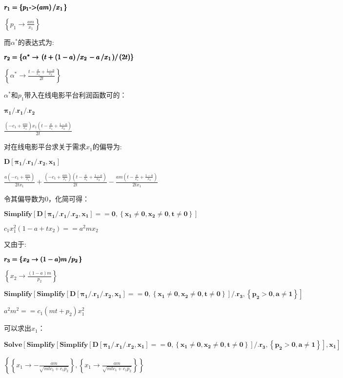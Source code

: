 \documentclass[paper=a4, fontsize=10.5pt]{scrartcl} %
\numberwithin{equation}{section} %
\numberwithin{figure}{section} %
\numberwithin{table}{section} %
\begin{document}
\begin{CJK}{UTF8}{gbsn}
\(\pmb{r_1 = \left\{p_1\text{-$>$} (a m)\left/x_1\right.\right\}}\)


\(\left\{p_1\to \frac{a m}{x_1}\right\}\)


而$\alpha^*$的表达式为:

\(\pmb{r_2 = \left\{\alpha ^* \to  \left.\left(t+ (1-a)\left/ x_2\right.-a\left/x_1\right.\right)\right/(2 t)\right\}}\)


\(\left\{\alpha ^*\to \frac{t-\frac{a}{x_1}+\frac{1-a}{x_2}}{2 t}\right\}\)


$\alpha^*$和$p_1$带入在线电影平台利润函数可的：

\(\pmb{\pi _1 \text{/.} r_1 \text{/.}r_2}\)


\(\frac{\left(-c_1+\frac{a m}{x_1}\right) x_1 \left(t-\frac{a}{x_1}+\frac{1-a}{x_2}\right)}{2 t}\)


对在线电影平台求关于需求$x_1$的偏导为:

\(\pmb{D\left[\pi _1 \text{/.} r_1 \text{/.}r_2,x_1\right]}\)


\(\frac{a \left(-c_1+\frac{a m}{x_1}\right)}{2 t x_1}+\frac{\left(-c_1+\frac{a m}{x_1}\right) \left(t-\frac{a}{x_1}+\frac{1-a}{x_2}\right)}{2
		t}-\frac{a m \left(t-\frac{a}{x_1}+\frac{1-a}{x_2}\right)}{2 t x_1}\)


令其偏导数为0，化简可得：

\(\pmb{\text{Simplify}\left[D\left[\pi _1 \text{/.} r_1 \text{/.}r_2,x_1\right]==0,\left\{x_1\neq 0,x_2\neq 0,t\neq 0\right\}\right]}\)


\(c_1 x_1^2 \left(1-a+t x_2\right)==a^2 m x_2\)


又由于:

\(\pmb{r_3 = \left\{x_2 \to  (1-a)m\left/p_2\right.\right\}}\)


\(\left\{x_2\to \frac{(1-a) m}{p_2}\right\}\)


\(\pmb{\text{Simplify}\left[\text{Simplify}\left[D\left[\pi _1 \text{/.} r_1 \text{/.}r_2,x_1\right]==0,\left\{x_1\neq 0,x_2\neq 0,t\neq
		0\right\}\right]\text{/.}r_3,\right.}
	\pmb{\left.\left\{p_2>0,a\neq 1\right\}\right]}\)


\(a^2 m^2==c_1 \left(m t+p_2\right) x_1^2\)


可以求出$x_1$：

\(\pmb{\text{Solve}\left[\text{Simplify}\left[\text{Simplify}\left[D\left[\pi _1 \text{/.} r_1 \text{/.}r_2,x_1\right]==0,\left\{x_1\neq
		0,x_2\neq 0,t\neq 0\right\}\right]\text{/.}r_3,\right.\right.}
	\pmb{\left.\left.\left\{p_2>0,a\neq 1\right\}\right],x_1\right]}\)


\(\left\{\left\{x_1\to -\frac{a m}{\sqrt{m t c_1+c_1 p_2}}\right\},\left\{x_1\to \frac{a m}{\sqrt{m t c_1+c_1 p_2}}\right\}\right\}\)



\end{CJK}
\end{document}
